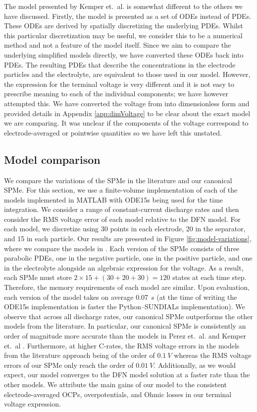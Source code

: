 \documentclass[a4paper]{article}
\begin{document}
The model presented by Kemper et.~al. \cite{kemper2013extended} is somewhat different to the others we have discussed. Firstly, the model is presented as a set of ODEs instead of PDEs. These ODEs are derived by spatially discretizing the underlying PDEs. Whilst this particular discretization may be useful, we consider this to be a numerical method and not a feature of the model itself. Since we aim to compare the underlying simplified models directly, we have converted these ODEs back into PDEs. The resulting PDEs that describe the concentrations in the electrode particles and the electrolyte, are equivalent to those used in our model. However, the expression for the terminal voltage is very different and it is not easy to prescribe meaning to each of the individual components; we have however attempted this. We have converted the voltage from \cite{kemper2013extended} into dimensionless form and provided details in Appendix \ref{app:dimVoltage} to be clear about the exact model we are comparing. It was unclear if the components of the voltage correspond to electrode-averaged or pointwise quantities so we have left this unstated. 

\subsection{Model comparison}
We compare the variations of the SPMe in the literature and our canonical SPMe. For this section, we use a finite-volume implementation of each of the models implemented in MATLAB with ODE15s being used for the time integration. We consider a range of constant-current discharge rates and then consider the RMS voltage error of each model relative to the DFN model. For each model, we discretize using 30 points in each electrode, 20 in the separator, and 15 in each particle. Our results are presented in Figure \ref{fig:model-variations}, where we compare the models in \cite{Perez2016, han2015simplification, kemper2013extended}. Each version of the SPMe consists of three parabolic PDEs, one in the negative particle, one in the positive particle, and one in the electrolyte alongside an algebraic expression for the voltage. As a result, each SPMe must store $2\times15 + (30 + 20 + 30)=120$ states at each time step. Therefore, the memory requirements of each model are similar. Upon evaluation, each version of the model takes on average \SI{0.07}{s} (at the time of writing the ODE15s implementation is faster the Python--SUNDIALs implementation). We observe that across all discharge rates, our canonical SPMe outperforms the other models from the literature. In particular, our canonical SPMe is consistently an order of magnitude more accurate than the models in Perez et.~al. \cite{Perez2016} and Kemper et.~al \cite{kemper2013extended}. Furthermore, at higher C-rates, the RMS voltage errors in the models from the literature approach being of the order of $\SI{0.1}{V}$ whereas the RMS voltage errors of our SPMe only reach the order of $\SI{0.01}{V}$. Additionally, as we would expect, our model converges to the DFN model solution at a faster rate than the other models. We attribute the main gains of our model to the consistent electrode-averaged OCPs, overpotentials, and Ohmic losses in our terminal voltage expression.
\end{document}
